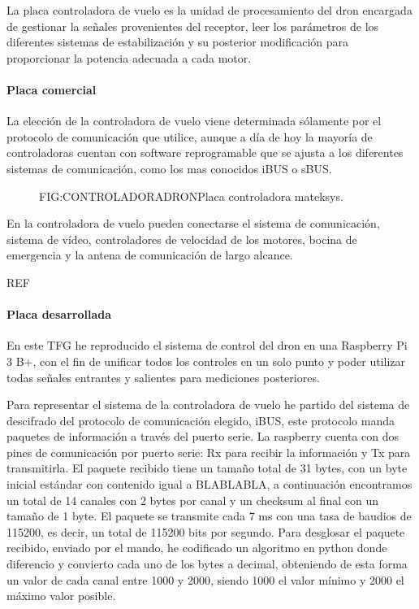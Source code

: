 	La placa controladora de vuelo es la unidad de procesamiento del dron encargada de gestionar la señales provenientes del receptor, leer los parámetros de los diferentes sistemas de estabilización y su posterior modificación para proporcionar la potencia adecuada a cada motor.
\paragraph{Placa comercial}
\label{SSSS:Placa comercial}
	La elección de la controladora de vuelo viene determinada sólamente por el protocolo de comunicación que utilice, aunque a día de hoy la mayoría de controladoras cuentan con software reprogramable que se ajusta a los diferentes sistemas de comunicación, como los mas conocidos iBUS o sBUS.
	
	\begin{figure}[Controladora de dron]{FIG:CONTROLADORADRON}{Placa controladora mateksys.}
\end{figure}

	En la controladora de vuelo pueden conectarse el sistema de comunicación, sistema de vídeo, controladores de velocidad de los motores, bocina de emergencia y la antena de comunicación de largo alcance.

REF %

\paragraph{Placa desarrollada}
\label{SSSS:Placa desarrollada}
	En este TFG he reproducido el sistema de control del dron en una Raspberry Pi 3 B+, con el fin de unificar todos los controles en un solo punto y poder utilizar todas señales entrantes y salientes para mediciones posteriores.
	
	Para representar el sistema de la controladora de vuelo he partido del sistema de descifrado del protocolo de comunicación elegido, iBUS, este protocolo manda paquetes de información a través del puerto serie. La raspberry cuenta con dos pines de comunicación por puerto serie: Rx para recibir la información y Tx para transmitirla.
El paquete recibido tiene un tamaño total de 31 bytes, con un byte inicial estándar con contenido igual a BLABLABLA, a continuación encontramos un total de 14 canales con 2 bytes por canal y un checksum al final con un tamaño de 1 byte. El paquete se transmite cada 7 ms con una tasa de baudios de 115200, es decir, un total de 115200 bits por segundo.
Para desglosar el paquete recibido, enviado por el mando, he codificado un algoritmo en python donde diferencio y convierto cada uno de los bytes a decimal, obteniendo de esta forma un valor de cada canal entre 1000 y 2000, siendo 1000 el valor mínimo y 2000 el máximo valor posible.

